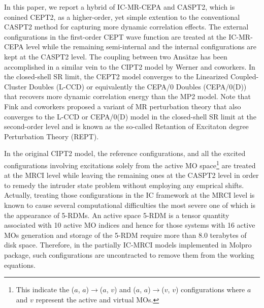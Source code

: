 \documentclass[aip,jcp,amsmath,twocolumn,floatfix,reprint,fleqn]{revtex4-1}
\begin{document}
%
In this paper, we report a hybrid of IC-MR-CEPA and CASPT2, which is conined CEPT2, as a higher-order, yet simple extention to the conventional CASPT2 method for capturing more dynamic correlation effects.
%
The external configurations in the first-order CEPT wave function are treated at the IC-MR-CEPA level while the remaining semi-internal and the internal configurations are kept at the CASPT2 level.
%
The coupling between two Ans\"atze has been accomplished in a similar vein to the CIPT2 model by Werner and coworkers.\cite{celanithe2004}
%
In the closed-shell SR limit, the CEPT2 model converges to the Linearized Coupled-Cluster Doubles (L-CCD) or equivalently the CEPA/0 Doubles (CEPA/0(D)) that recovers more dynamic correlation energy than the MP2 model.
%
Note that Fink and coworkers proposed a variant of MR perturbation theory\cite{FINK2006461,FINK200939,doi:10.1021/acs.jctc.6b00898} that also converges to the L-CCD or CEPA/0(D) model in the closed-shell SR limit at the second-order level and is known as the so-called Retantion of Excitaton degree Perturbation Theory (REPT).

%
In the original CIPT2 model,\cite{Celani2000,PCMRCI2011} the reference configurations, and all the excited configurations involving excitations solely from the active MO space\footnote{This indicate the ($a$, $a$)$\rightarrow$($a$, $v$) and ($a$, $a$)$\rightarrow$($v$, $v$) configurations where $a$ and $v$ represent the active and virtual MOs.} are treated at the MRCI level while leaving the remaining ones at the CASPT2 level in order to remedy the intruder state problem without employing any emprical shifts.
%
Actually, treating those configurations in the IC framework at the MRCI level is known to cause several computational difficulties the most severe one of which is the appearance of 5-RDMs.\cite{doi:10.1063/1.443357}
%
An active space 5-RDM is a tensor quantity associated with 10 active MO indices and hence for those systems with 16 active MOs generation and storage of the 5-RDM require more than 8.0 terabytes of disk space.
%
Therefore, in the partially IC-MRCI models\cite{PCMRCI1988,PCMRCI2011} implemented in Molpro package,\cite{Molpro} such configurations are uncontracted to remove them from the working equations.
\end{document}
